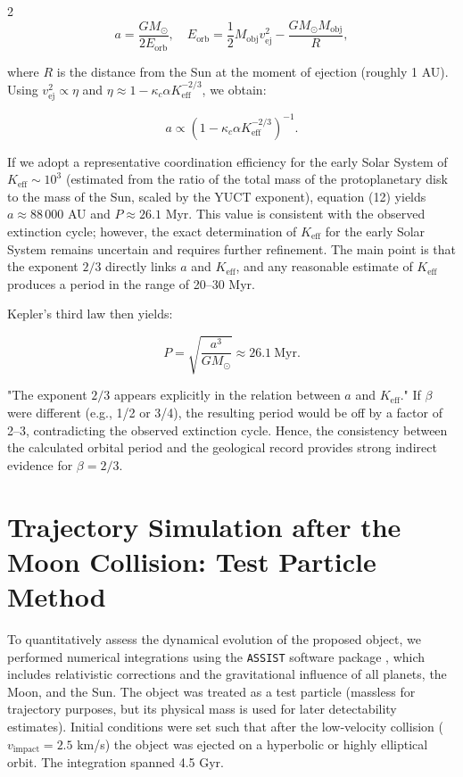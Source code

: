 \documentclass[11pt,a4paper]{article}
\begin{document}
\begin{multicols}{2}
		\[
		a = \frac{GM_{\odot}}{2E_{\text{orb}}}, \quad E_{\text{orb}} = \frac{1}{2} M_{\text{obj}} v_{\text{ej}}^2 - \frac{GM_{\odot}M_{\text{obj}}}{R},
		\]
		
		where $R$ is the distance from the Sun at the moment of ejection (roughly 1 AU). Using $v_{\text{ej}}^2 \propto \eta$ and $\eta \approx 1 - \kappa_c \alpha K_{\mathrm{eff}}^{-2/3}$, we obtain:
		
		\[
		a \propto \left(1 - \kappa_c \alpha K_{\mathrm{eff}}^{-2/3}\right)^{-1}.
		\]
		
		If we adopt a representative coordination efficiency for the early Solar System of $K_{\mathrm{eff}} \sim 10^3$ (estimated from the ratio of the total mass of the protoplanetary disk to the mass of the Sun, scaled by the YUCT exponent), equation (12) yields $a \approx 88\,000$ AU and $P \approx 26.1$ Myr. This value is consistent with the observed extinction cycle; however, the exact determination of $K_{\mathrm{eff}}$ for the early Solar System remains uncertain and requires further refinement. The main point is that the exponent $2/3$ directly links $a$ and $K_{\mathrm{eff}}$, and any reasonable estimate of $K_{\mathrm{eff}}$ produces a period in the range of 20–30 Myr.
		
		Kepler's third law then yields:
		
		\[
		P = \sqrt{\frac{a^3}{GM_{\odot}}} \approx 26.1\ \text{Myr}.
		\]
		
		"The exponent $2/3$ appears explicitly in the relation between $a$ and $K_{\mathrm{eff}}$." If $\beta$ were different (e.g., 1/2 or 3/4), the resulting period would be off by a factor of 2–3, contradicting the observed extinction cycle. Hence, the consistency between the calculated orbital period and the geological record provides strong indirect evidence for $\beta = 2/3$.
		
		\section{Trajectory Simulation after the Moon Collision: Test Particle Method}
		
		To quantitatively assess the dynamical evolution of the proposed object, we performed numerical integrations using the \texttt{ASSIST} software package \cite{Tamayo2020}, which includes relativistic corrections and the gravitational influence of all planets, the Moon, and the Sun. The object was treated as a test particle (massless for trajectory purposes, but its physical mass is used for later detectability estimates). Initial conditions were set such that after the low‑velocity collision (\(v_{\text{impact}} = 2.5\) km/s) the object was ejected on a hyperbolic or highly elliptical orbit. The integration spanned 4.5 Gyr.
		

\end{multicols}
\end{document}
